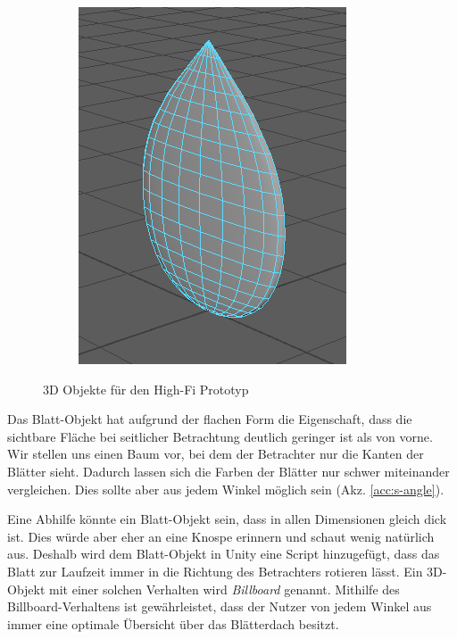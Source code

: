 \begin{figure}[htb]
\begin{subfigure}[b]{\fwidth}
  	\includegraphics[width=\textwidth]{figures/leaf}
  	 \label{fig:leaf}
  \end{subfigure}
  \caption{3D Objekte für den High-Fi Prototyp} \label{fig:3d-objects}
\end{figure}

Das Blatt-Objekt hat aufgrund der flachen Form die Eigenschaft, dass die sichtbare Fläche bei seitlicher Betrachtung deutlich geringer ist als von vorne. Wir stellen uns einen Baum vor, bei dem der Betrachter nur die Kanten der Blätter sieht. Dadurch lassen sich die Farben der Blätter nur schwer miteinander vergleichen. Dies sollte aber aus jedem Winkel möglich sein (Akz. \ref{acc:s-angle}).

Eine Abhilfe könnte ein Blatt-Objekt sein, dass in allen Dimensionen gleich dick ist. Dies würde aber eher an eine Knospe erinnern und schaut wenig natürlich aus. Deshalb wird dem Blatt-Objekt in Unity eine Script hinzugefügt, dass das Blatt zur Laufzeit immer in die Richtung des Betrachters rotieren lässt. Ein 3D-Objekt mit einer solchen Verhalten wird \textit{Billboard} genannt. Mithilfe des Billboard-Verhaltens ist gewährleistet, dass der Nutzer von jedem Winkel aus immer eine optimale Übersicht über das Blätterdach besitzt.

